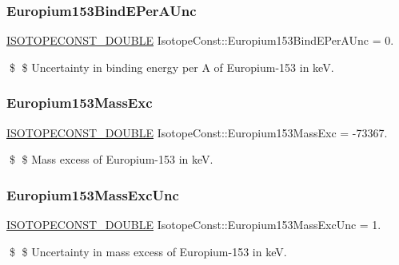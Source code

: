 \subsubsection{\texorpdfstring{Europium153\+Bind\+E\+Per\+A\+Unc}{Europium153BindEPerAUnc}}
{\footnotesize\ttfamily \mbox{\hyperlink{group___isotope_const-_macros_ga8f45a7272ce02c0b4c65c44636ed719a}{I\+S\+O\+T\+O\+P\+E\+C\+O\+N\+S\+T\+\_\+\+D\+O\+U\+B\+LE}} Isotope\+Const\+::\+Europium153\+Bind\+E\+Per\+A\+Unc = 0.}

\$ \$ Uncertainty in binding energy per A of Europium-\/153 in keV. \mbox{\label{group___isotope_const-_europium-_eu153_ga03f2a419b79b1267980b04074b31ca1f}} 
\subsubsection{\texorpdfstring{Europium153\+Mass\+Exc}{Europium153MassExc}}
{\footnotesize\ttfamily \mbox{\hyperlink{group___isotope_const-_macros_ga8f45a7272ce02c0b4c65c44636ed719a}{I\+S\+O\+T\+O\+P\+E\+C\+O\+N\+S\+T\+\_\+\+D\+O\+U\+B\+LE}} Isotope\+Const\+::\+Europium153\+Mass\+Exc = -\/73367.}

\$ \$ Mass excess of Europium-\/153 in keV. \mbox{\label{group___isotope_const-_europium-_eu153_ga12d2d0f47d97241c25dd2b8fbe4172d6}} 
\subsubsection{\texorpdfstring{Europium153\+Mass\+Exc\+Unc}{Europium153MassExcUnc}}
{\footnotesize\ttfamily \mbox{\hyperlink{group___isotope_const-_macros_ga8f45a7272ce02c0b4c65c44636ed719a}{I\+S\+O\+T\+O\+P\+E\+C\+O\+N\+S\+T\+\_\+\+D\+O\+U\+B\+LE}} Isotope\+Const\+::\+Europium153\+Mass\+Exc\+Unc = 1.}

\$ \$ Uncertainty in mass excess of Europium-\/153 in keV. \mbox{\label{group___isotope_const-_europium-_eu153_gab2777ac886947e18bf65927205ee6157}} 
